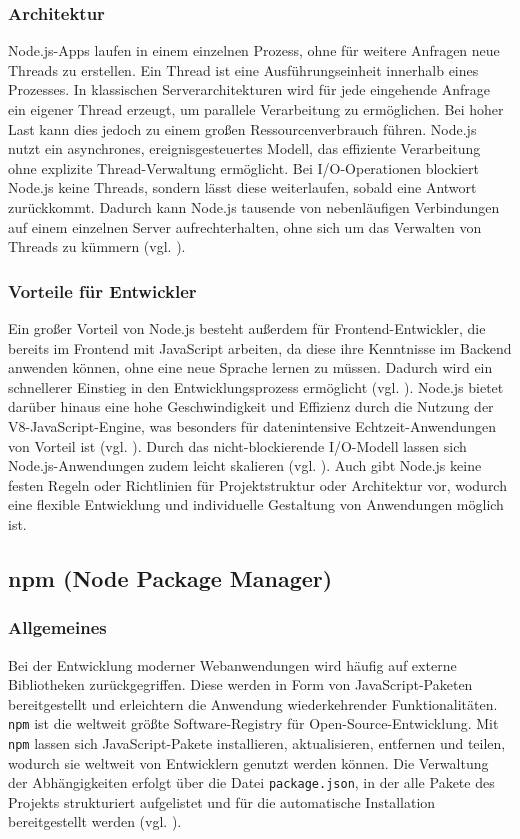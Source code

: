 \documentclass[oneside]{ausarbeitung}
\begin{document}
\subsubsection{Architektur}
Node.js-Apps laufen in einem einzelnen Prozess, ohne für weitere Anfragen neue Threads zu erstellen. Ein Thread ist eine Ausführungseinheit innerhalb eines Prozesses. In klassischen Serverarchitekturen wird für jede eingehende Anfrage ein eigener Thread erzeugt, um parallele Verarbeitung zu ermöglichen. Bei hoher Last kann dies jedoch zu einem großen Ressourcenverbrauch führen. 
Node.js nutzt ein asynchrones, ereignisgesteuertes Modell, das effiziente Verarbeitung ohne explizite Thread-Verwaltung ermöglicht. Bei I/O-Operationen blockiert Node.js keine Threads, sondern lässt diese weiterlaufen, sobald eine Antwort zurückkommt. Dadurch kann Node.js tausende von nebenläufigen Verbindungen auf einem einzelnen Server aufrechterhalten, ohne sich um das Verwalten von Threads zu kümmern (vgl. \parencite{nodejs}).

\subsubsection{Vorteile für Entwickler}
Ein großer Vorteil von Node.js besteht außerdem für Frontend-Entwickler, die bereits im Frontend mit JavaScript arbeiten, da diese ihre Kenntnisse im Backend anwenden können, ohne eine neue Sprache lernen zu müssen. Dadurch wird ein schnellerer Einstieg in den Entwicklungsprozess ermöglicht (vgl. \parencite{nodejs}). 
Node.js bietet darüber hinaus eine hohe Geschwindigkeit und Effizienz durch die Nutzung der V8-JavaScript-Engine, was besonders für datenintensive Echtzeit-Anwendungen von Vorteil ist (vgl. \parencite{nodejs-v8}).  
Durch das nicht-blockierende I/O-Modell lassen sich Node.js-Anwendungen zudem leicht skalieren (vgl. \parencite{nodejs-nonblocking}). Auch gibt Node.js keine festen Regeln oder Richtlinien für Projektstruktur oder Architektur vor, wodurch eine flexible Entwicklung und individuelle Gestaltung von Anwendungen möglich ist.


\subsection{npm (Node Package Manager)}
\subsubsection{Allgemeines}
Bei der Entwicklung moderner Webanwendungen wird häufig auf externe Bibliotheken zurückgegriffen. Diese werden in Form von JavaScript-Paketen bereitgestellt und erleichtern die Anwendung wiederkehrender Funktionalitäten. 
\texttt{npm} ist die weltweit größte Software-Registry für Open-Source-Entwicklung. Mit \texttt{npm} lassen sich JavaScript-Pakete installieren, aktualisieren, entfernen und teilen, wodurch sie weltweit von Entwicklern genutzt werden können. Die Verwaltung der Abhängigkeiten erfolgt über die Datei \texttt{package.json}, in der alle Pakete des Projekts strukturiert aufgelistet und für die automatische Installation bereitgestellt werden (vgl. \parencite{npm}).
\end{document}
